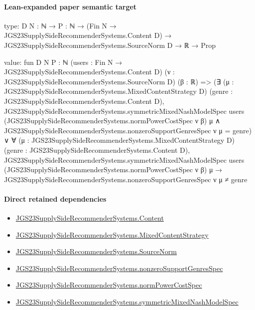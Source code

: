 \documentclass[10pt]{article}
\begin{document}
\paragraph{Lean-expanded paper semantic target}
\begin{ReviewVerbatim}
type:
{D N : ℕ} →
  {P : ℕ} →
    (Fin N → JGS23SupplySideRecommenderSystems.Content D) → JGS23SupplySideRecommenderSystems.SourceNorm D → ℝ → Prop

value:
fun {D N P : ℕ} (users : Fin N → JGS23SupplySideRecommenderSystems.Content D)
    (ν : JGS23SupplySideRecommenderSystems.SourceNorm D) (β : ℝ) =>
  (∃ (μ : JGS23SupplySideRecommenderSystems.MixedContentStrategy D) (genre :
      JGS23SupplySideRecommenderSystems.Content D),
      JGS23SupplySideRecommenderSystems.symmetricMixedNashModelSpec users
          (JGS23SupplySideRecommenderSystems.normPowerCostSpec ν β) μ ∧
        JGS23SupplySideRecommenderSystems.nonzeroSupportGenresSpec ν μ = {genre}) ∨
    ∀ (μ : JGS23SupplySideRecommenderSystems.MixedContentStrategy D)
      (genre : JGS23SupplySideRecommenderSystems.Content D),
      JGS23SupplySideRecommenderSystems.symmetricMixedNashModelSpec users
          (JGS23SupplySideRecommenderSystems.normPowerCostSpec ν β) μ →
        JGS23SupplySideRecommenderSystems.nonzeroSupportGenresSpec ν μ ≠ {genre}
\end{ReviewVerbatim}

\paragraph{Direct retained dependencies}
\begin{itemize}\raggedright
\item \hyperlink{governing-declaration-367305fda50f0ada}{JGS23\allowbreak{}Supply\allowbreak{}Side\allowbreak{}Recommender\allowbreak{}Systems.\allowbreak{}Content}
\item \hyperlink{governing-declaration-2089965d06cf0282}{JGS23\allowbreak{}Supply\allowbreak{}Side\allowbreak{}Recommender\allowbreak{}Systems.\allowbreak{}Mixed\allowbreak{}Content\allowbreak{}Strategy}
\item \hyperlink{governing-declaration-6141339a5d3412d9}{JGS23\allowbreak{}Supply\allowbreak{}Side\allowbreak{}Recommender\allowbreak{}Systems.\allowbreak{}Source\allowbreak{}Norm}
\item \hyperlink{governing-declaration-588c7a0b2af225d7}{JGS23\allowbreak{}Supply\allowbreak{}Side\allowbreak{}Recommender\allowbreak{}Systems.\allowbreak{}nonzero\allowbreak{}Support\allowbreak{}Genres\allowbreak{}Spec}
\item \hyperlink{governing-declaration-6ba13dc1cae95e6e}{JGS23\allowbreak{}Supply\allowbreak{}Side\allowbreak{}Recommender\allowbreak{}Systems.\allowbreak{}norm\allowbreak{}Power\allowbreak{}Cost\allowbreak{}Spec}
\item \hyperlink{paper-prerequisite-b412efba7deb757f}{JGS23\allowbreak{}Supply\allowbreak{}Side\allowbreak{}Recommender\allowbreak{}Systems.\allowbreak{}symmetric\allowbreak{}Mixed\allowbreak{}Nash\allowbreak{}Model\allowbreak{}Spec}
\end{itemize}
\end{document}
